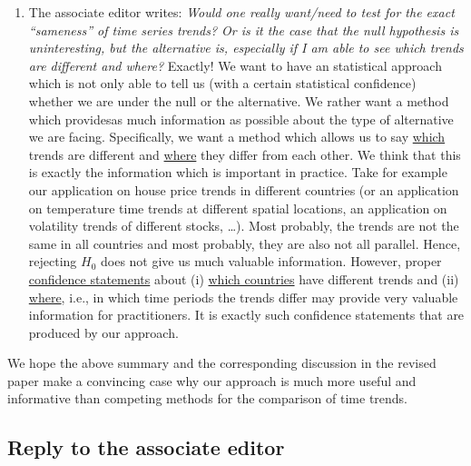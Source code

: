 \documentclass[a4paper,12pt]{article}
\begin{document}
\begin{enumerate}[label=\arabic*.,leftmargin=0.6cm]
\begin{enumerate}[leftmargin=0.7cm]
\item The associate editor writes: \textit{Would one really want/need to test for the exact ``sameness'' of time series trends? Or is it the case that the null hypothesis is uninteresting, but the alternative is, especially if I am able to see which trends are different and where?} Exactly! We want to have an statistical approach which is not only able to tell us (with a certain statistical confidence) whether we are under the null or the alternative. We rather want a method which providesas much information as possible about the type of alternative we are facing. Specifically, we want a method which allows us to say \underline{which} trends are different and \underline{where} they differ from each other. We think that this is exactly the information which is important in practice. Take for example our application on house price trends in different countries (or an application on temperature time trends at different spatial locations, an application on volatility trends of different stocks, \ldots).  Most probably, the trends are not the same in all countries and most probably, they are also not all parallel. Hence, rejecting $H_0$ does not give us much valuable information. However, proper \underline{confidence statements} about (i) \underline{which countries} have different trends and (ii) \underline{where}, i.e., in which time periods the trends differ may provide very valuable information for practitioners. It is exactly such confidence statements that are produced by our approach. 
\end{enumerate}  

We hope the above summary and the corresponding discussion in the revised paper make a convincing case why our approach is much more useful and informative than competing methods for the comparison of time trends. 

\end{enumerate}



\subsection*{Reply to the associate editor}
\end{document}
